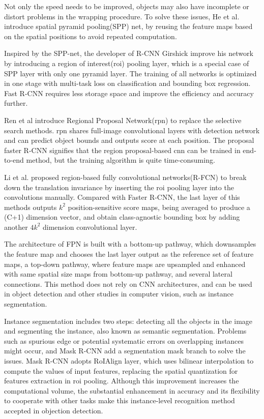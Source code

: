 Not only the speed needs to be improved, objects may also have incomplete or distort problems in the wrapping procedure. To solve these issues, He et al.\cite{he_spatial_2014} introduce spatial pyramid pooling(SPP) net, by reusing the feature maps based on the spatial positions to avoid repeated computation.

Inspired by the SPP-net, the developer of R-CNN Girshick improve his network by introducing a region of interest(\acrshort{roi}) pooling layer, which is a special case of SPP layer with only one pyramid layer\cite{girshick_fast_2015}. The training of all networks is optimized in one stage with multi-task loss on classification and bounding box regression. Fast R-CNN requires less storage space and improve the efficiency and accuracy further.

Ren et al\cite{ren_faster_2016} introduce Regional Proposal Network(\acrshort{rpn}) to replace the selective search methods. \acrshort{rpn} shares full-image convolutional layers with detection network and can predict object bounds and outputs score at each position. The proposal faster R-CNN signifies that the region proposal-based \acrshort{cnn} can be trained in end-to-end method, but the training algorithm is quite time-consuming.

Li et al.\cite{dai_r-fcn_2016} proposed region-based fully convolutional networks(R-FCN) to break down the translation invariance by inserting the \acrshort{roi} pooling layer into the convolutions manually. Compared with Faster R-CNN, the last layer of this methods outputs \(k^{2}\) position-sensitive score maps, being averaged to produce a (C+1) dimension vector, and obtain class-agnostic bounding box by adding another \(4k^{2}\) dimension convolutional layer. 

The architecture of FPN\cite{lin_feature_2017} is built with a bottom-up pathway, which downsamples the feature map and chooses the last layer output as the reference set of feature maps, a top-down pathway, where feature maps are upsampled and enhanced with same spatial size maps from bottom-up pathway, and several lateral connections. This method does not rely on CNN architectures, and can be used in object detection and other studies in computer vision, such as instance segmentation.

Instance segmentation includes two steps: detecting all the objects in the image and segmenting the instance, also known as semantic segmentation. Problems such as spurious edge or potential systematic errors on overlapping instances might occur\cite{arnab_pixelwise_2017}, and Mask R-CNN\cite{he_mask_2018} add a segmentation mask branch to solve the issues. Mask R-CNN adopts RoIAlign layer, which uses bilinear interpolation to compute the values of input features, replacing the spatial quantization for features extraction in 
\acrshort{roi} pooling. Although this improvement increases the computational volume, the substantial enhancement in accuracy and its flexibility to cooperate with other tasks make this instance-level recognition method accepted in objection detection.

